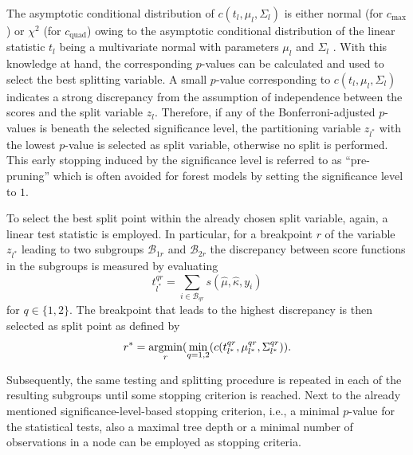 \documentclass[nojss,shortnames]{jss}
\newcommand{\argmin}{\operatorname{argmin}\displaylimits}
\numberwithin{equation}{section}
\begin{document}
\begin{appendix}
The asymptotic conditional distribution of $c(t_{l},\mu_{l},\Sigma_{l})$ is
either normal (for $c_{\text{max}}$) or $\chi^2$ (for $c_{\text{quad}}$) owing
to the asymptotic conditional distribution of the linear statistic $t_l$ being
a multivariate normal with parameters $\mu_l$ and $\Sigma_l$
\citep{Strasser+Weber:1999}. With this knowledge at hand, the corresponding
$p$-values can be calculated and used to select the best splitting variable. A
small $p$-value corresponding to $c(t_{l},\mu_{l},\Sigma_{l})$ indicates a
strong discrepancy from the assumption of independence between the scores and
the split variable $z_l$. Therefore, if any of the Bonferroni-adjusted
$p$-values is beneath the selected significance level, the partitioning
variable $z_{l^\ast}$ with the lowest $p$-value is selected as split variable,
otherwise no split is performed. This early stopping induced by the
significance level is referred to as ``pre-pruning'' which is often avoided for
forest models by setting the significance level to $1$.

To select the best split point within the already chosen split variable, again,
a linear test statistic is employed. In particular, for a breakpoint $r$ of the
variable $z_{l^{\ast}}$ leading to two subgroups $\mathcal{B}_{1r}$ and
$\mathcal{B}_{2r}$ the discrepancy between score functions in the subgroups is
measured by evaluating
\begin{equation}
t_{l^{\ast}}^{qr} = \sum_{i \in \mathcal{B}_{qr}} s(\hat{\mu}, \hat{\kappa}, y_i)
\end{equation}
for $q \in \{1,2\}$. The breakpoint that leads to the highest discrepancy is
then selected as split point as defined by
\begin{equation}
r^{\ast} = \argmin_{r} (\min_{q=1,2}(c(t_{l^{\ast}}^{qr},\mu_{l^{\ast}}^{qr},\Sigma_{l^{\ast}}^{qr})).
\end{equation}

Subsequently, the same testing and splitting procedure is repeated in each of
the resulting subgroups until some stopping criterion is reached. Next to the
already mentioned significance-level-based stopping criterion, i.e., a minimal
$p$-value for the statistical tests, also a maximal tree depth or a minimal
number of observations in a node can be employed as stopping criteria.



\end{appendix}
\end{document}
